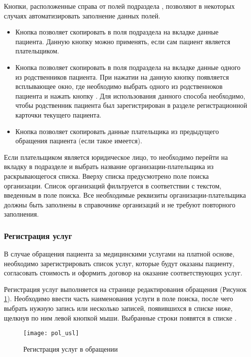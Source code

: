 Кнопки, расположенные справа от полей подраздела , позволяют в некоторых случаях автоматизировать заполнение данных полей. 
\begin{itemize}
	\item Кнопка  позволяет скопировать в поля подраздела  на вкладке  данные пациента. Данную кнопку можно применять, если сам пациент является плательщиком.
	\item Кнопка  позволяет скопировать в поля подраздела  на вкладке  данные одного из родственников пациента. При нажатии на данную кнопку появляется всплывающее окно, где необходимо выбрать одного из родственноков пациента и нажать кнопку . Для использования данного способа необходимо, чтобы родственник пациента был зарегистрирован в разделе  регистрационной карточки текущего пациента.
	\item Кнопка  позволяет скопировать данные плательщика из предыдущего обращения пациента (если такое имеется).
\end{itemize} 

Если плательщиком является юридическое лицо, то необходимо перейти на вкладку  в подразделе  и выбрать название организации-плательщика из раскрывающегося списка. Вверху списка предусмотрено поле поиска организации. Список организаций фильтруется в соответствии с текстом, введенным в поле поиска. Все необходимые реквизиты организации-плательщика должны быть заполнены в справочнике организаций и не требуют повторного заполнения.

\subsubsection{Регистрация услуг}

В случае обращения пациента за медицинскими услугами на платной основе, необходимо зарегистрировать список услуг, которые будут оказаны пациенту, согласовать стоимость и оформить договор на оказание соответствующих услуг.

Регистрация услуг выполняется на странице редактирования обращения (Рисунок \ref{img_pol_usl}). Необходимо ввести часть наименования услуги в поле поиска, после чего выбрать нужную запись или несколько записей, появившихся в списке ниже, щелкнув по ним левой кнопкой мыши. Выбранные строки появятся в списке .

\begin{figure}[ht]\centering
	\texttt{[image: pol\_usl]}
	\caption{Регистрация услуг в обращении}
	\label{img_pol_usl}
\end{figure}


